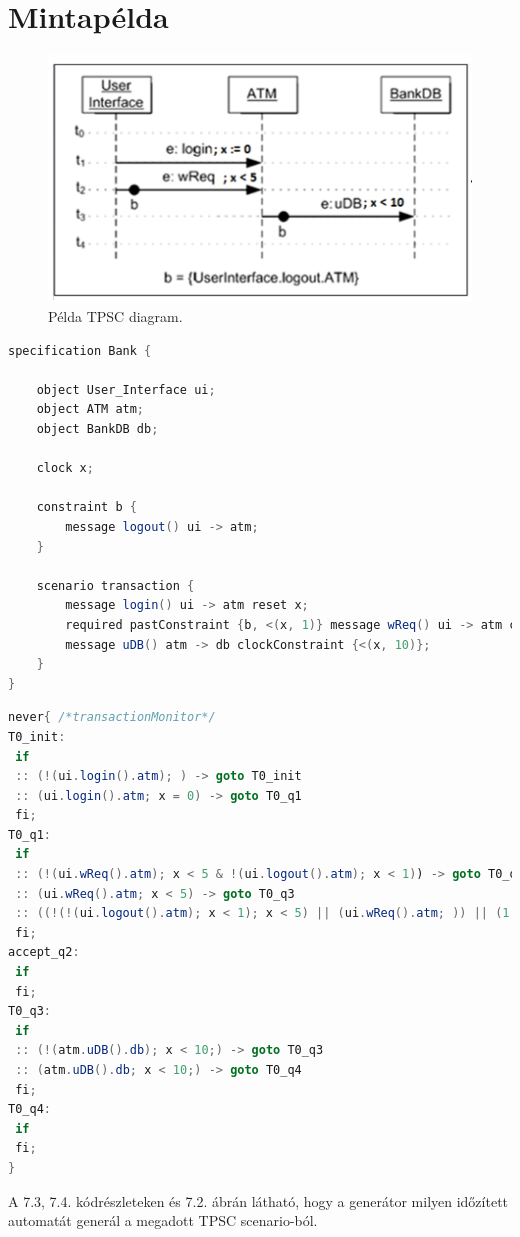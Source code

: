 \section{Mintapélda}

\begin{figure}[h!]
    \centering
    \includegraphics[width=130mm, keepaspectratio]{figures/14abra.png}
    \caption{Példa TPSC diagram.}
\end{figure}

\begin{lstlisting}[language=java,frame=single, float=h!, caption={TPSC scenario szöveges leírása.},captionpos=b]
specification Bank {

	object User_Interface ui;
	object ATM atm;
	object BankDB db;

	clock x;

	constraint b {
		message logout() ui -> atm;
	}

	scenario transaction {
		message login() ui -> atm reset x;
		required pastConstraint {b, <(x, 1)} message wReq() ui -> atm clockConstraint {<(x, 5)};
		message uDB() atm -> db clockConstraint {<(x, 10)};
	}
}
\end{lstlisting}

\begin{lstlisting}[language=java,frame=single, float=h!, caption={Generált időzített automata never claim formátumban.},captionpos=b]
never{ /*transactionMonitor*/
T0_init:
 if
 :: (!(ui.login().atm); ) -> goto T0_init
 :: (ui.login().atm; x = 0) -> goto T0_q1
 fi;
T0_q1:
 if
 :: (!(ui.wReq().atm); x < 5 & !(ui.logout().atm); x < 1)) -> goto T0_q1
 :: (ui.wReq().atm; x < 5) -> goto T0_q3
 :: ((!(!(ui.logout().atm); x < 1); x < 5) || (ui.wReq().atm; )) || (1, x >= 5))) -> goto accept_q2
 fi;
accept_q2:
 if
 fi;
T0_q3:
 if
 :: (!(atm.uDB().db); x < 10;) -> goto T0_q3
 :: (atm.uDB().db; x < 10;) -> goto T0_q4
 fi;
T0_q4:
 if
 fi;
}
\end{lstlisting}

A 7.3, 7.4. kódrészleteken és 7.2. ábrán látható, hogy a generátor milyen időzített automatát generál a megadott TPSC scenario-ból.